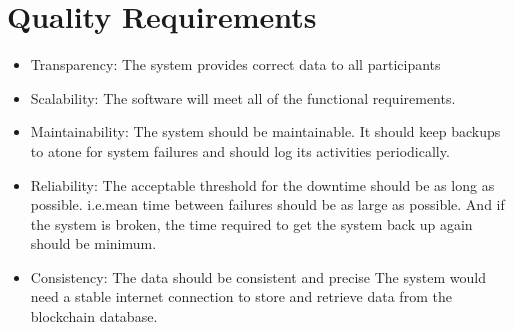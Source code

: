 \section{Quality Requirements} 
\begin{itemize}
    \item Transparency: The system provides correct data to all participants
    \item  Scalability: The software will meet all of the functional requirements. 
    \item  Maintainability: The system should be maintainable. It should keep backups to atone for system failures and should log its activities periodically.
    \item  Reliability: The acceptable threshold for the downtime should be as long as possible. i.e.mean time between failures should be as large as possible. And if the system is broken, the time required to get the system back up again should be minimum. 
    \item  Consistency: The data should be consistent and precise The system would need a stable internet connection to store and retrieve data from the blockchain database. 
\end{itemize}


